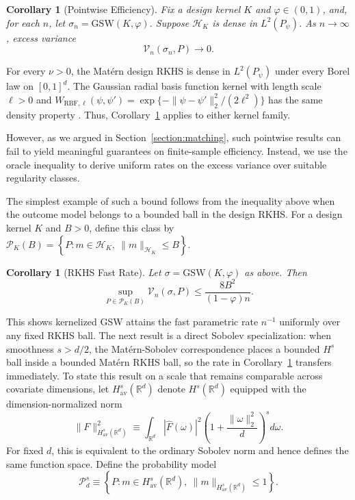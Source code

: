 \documentclass[letterpaper,12pt]{article}
\newtheorem{cor}[thm]{Corollary}
\theoremstyle{definition}
\numberwithin{equation}{section}
\newcommand{\mr}{\mathbb{R}}
\newcommand{\mc}{\mathcal}
\newcommand{\norm}[1]{\lVert#1\rVert}
\begin{document}
\begin{cor}[Pointwise Efficiency]\label{corollary:kernel-pointwise}
Fix a design kernel $K$ and $\varphi\in(0,1)$, and, for each $n$, let $\sigma_n=\mathrm{GSW}(K,\varphi)$.
Suppose $\mc H_K$ is dense in $L^2(P_\psi)$.
As $n \to \infty$, excess variance 
\[
\mc V_n(\sigma_n,P) \longrightarrow 0.
\]
\end{cor}

For every $\nu>0$, the Mat\'ern design RKHS is dense in $L^2(P_\psi)$ under every Borel law on $[0,1]^d$.
The Gaussian radial basis function kernel with length scale $\ell>0$ and $W_{\mathrm{RBF},\ell}(\psi,\psi')=\exp\{-\norm{\psi-\psi'}_2^2/(2\ell^2)\}$ has the same density property \citep{scholkopf2002learning}.
Thus, Corollary~\ref{corollary:kernel-pointwise} applies to either kernel family.


However, as we argued in Section~\ref{section:matching}, such pointwise results can fail to yield meaningful guarantees on finite-sample efficiency.
Instead, we use the oracle inequality to derive uniform rates on  the excess variance over suitable regularity classes.

The simplest example of such a bound follows from the inequality above when the outcome model belongs to a bounded ball in the design RKHS.
For a design kernel $K$ and $B>0$, define this class by $\mc P_K(B)=\left\{P:m\in\mc H_K,\ \norm{m}_{\mc H_K}\leq B\right\}$.

\begin{cor}[RKHS Fast Rate]\label{corollary:kernel-ball}
Let $\sigma=\mathrm{GSW}(K,\varphi)$ as above.
Then
\begin{equation}\label{equation:kernel-ball}
\sup_{P\in\mc P_K(B)}\mc V_n(\sigma,P) \leq \frac{8B^2}{(1-\varphi)n}.
\end{equation}
\end{cor}

This shows kernelized GSW attains the fast parametric rate $n^{-1}$ uniformly over any fixed RKHS ball.
The next result is a direct Sobolev specialization: when smoothness $s>d/2$, the Mat\'ern-Sobolev correspondence places a bounded $H^s$ ball inside a bounded Mat\'ern RKHS ball, so the rate in Corollary~\ref{corollary:kernel-ball} transfers immediately.
To state this result on a scale that remains comparable across covariate dimensions, let $H_{\mathrm{av}}^s(\mr^d)$ denote $H^s(\mr^d)$ equipped with the dimension-normalized norm
\begin{equation}\label{equation:average-sobolev-norm}
\norm{F}_{H_{\mathrm{av}}^s(\mr^d)}^2\equiv\int_{\mr^d}|\widehat F(\omega)|^2\left(1+\frac{\norm{\omega}_2^2}{d}\right)^sd\omega.
\end{equation}
For fixed $d$, this is equivalent to the ordinary Sobolev norm and hence defines the same function space.
Define the probability model 
\begin{equation}\label{equation:sobolev-outcome-class}
\mc P_d^s \equiv \left\{ P: m\in H_{\mathrm{av}}^s(\mr^d),\ \norm{m}_{H_{\mathrm{av}}^s(\mr^d)} \leq 1 \right\}.
\end{equation}
\end{document}
